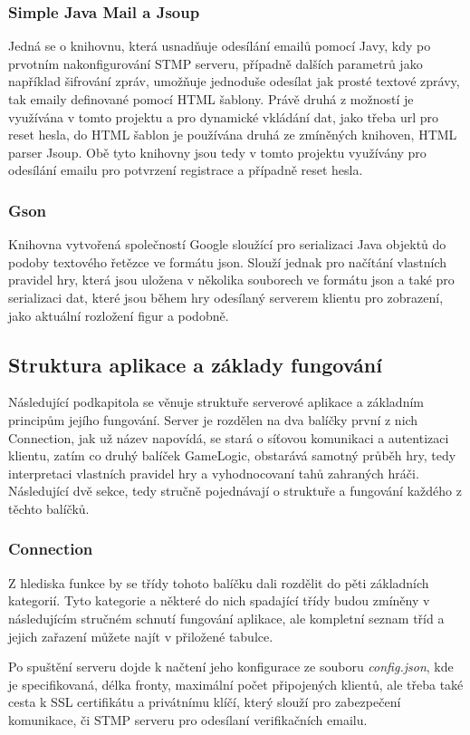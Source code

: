 \documentclass[12pt]{article}
\begin{document}
\subsubsection{Simple Java Mail a Jsoup}
Jedná se o knihovnu, která usnadňuje odesílání emailů pomocí Javy, kdy po prvotním nakonfigurování STMP serveru, případně dalších parametrů jako například šifrování zpráv, umožňuje jednoduše odesílat jak prosté textové zprávy, tak emaily definované pomocí HTML šablony. Právě druhá z možností je využívána v tomto projektu a pro dynamické vkládání dat, jako třeba url pro reset hesla, do HTML šablon je používána druhá ze zmíněných knihoven, HTML parser Jsoup. Obě tyto knihovny jsou tedy v tomto projektu využívány  pro odesílání emailu pro potvrzení registrace a případně reset hesla.
\subsubsection{Gson}
Knihovna vytvořená společností Google sloužící pro serializaci Java objektů do podoby textového řetězce ve formátu json. Slouží jednak pro načítání vlastních pravidel hry, která jsou uložena v několika souborech ve formátu json a také pro serializaci dat, které jsou během hry odesílaný serverem klientu pro zobrazení, jako aktuální rozložení figur a podobně.
\newpage
\subsection{Struktura aplikace a základy fungování}
Následující podkapitola se věnuje struktuře serverové aplikace a základním principům jejího fungování. Server je rozdělen na dva balíčky první z nich Connection, jak už název napovídá, se stará o síťovou komunikaci a autentizaci klientu, zatím co druhý balíček GameLogic, obstarává samotný průběh hry, tedy interpretaci vlastních pravidel hry a vyhodnocovaní tahů zahraných hráči. Následující dvě sekce, tedy stručně pojednávají o struktuře a fungování každého z těchto balíčků. 
\subsubsection{Connection}
Z hlediska funkce by se třídy tohoto balíčku dali rozdělit do pěti základních kategorií. Tyto kategorie a některé do nich spadající třídy budou zmíněny v následujícím stručném schnutí fungování aplikace, ale kompletní seznam tříd a jejich zařazení můžete najít v přiložené tabulce.

Po spuštění serveru dojde k načtení jeho konfigurace ze souboru \textit{config.json}, kde je specifikovaná, délka fronty, maximální počet připojených klientů, ale třeba také cesta k SSL certifikátu a privátnímu klíčí, který slouží pro zabezpečení komunikace, či STMP serveru pro odesílaní verifikačních emailu.
\end{document}

